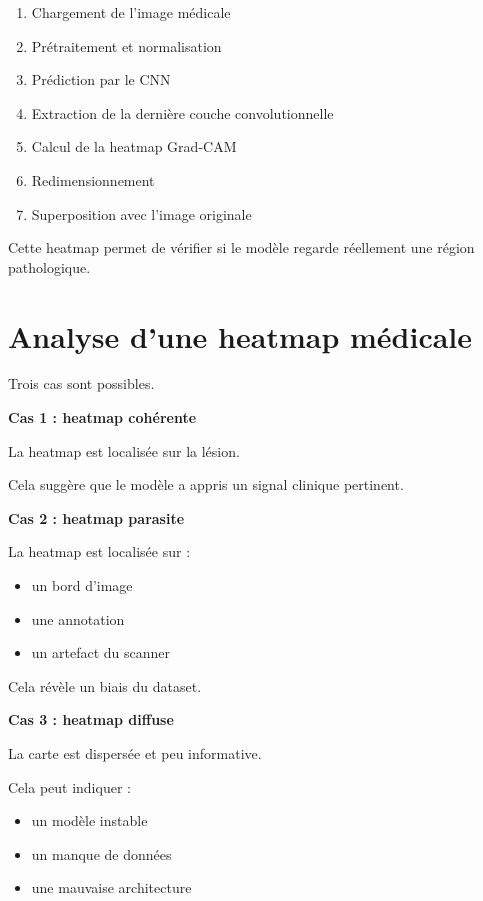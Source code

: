 ﻿\documentclass[11pt,a4paper]{article}
\begin{document}
\begin{enumerate}

\item Chargement de l'image médicale

\item Prétraitement et normalisation

\item Prédiction par le CNN

\item Extraction de la dernière couche convolutionnelle

\item Calcul de la heatmap Grad-CAM

\item Redimensionnement

\item Superposition avec l'image originale

\end{enumerate}

Cette heatmap permet de vérifier si le modèle regarde réellement une région pathologique.

\section{Analyse d'une heatmap médicale}

Trois cas sont possibles.

\textbf{Cas 1 : heatmap cohérente}

La heatmap est localisée sur la lésion.

Cela suggère que le modèle a appris un signal clinique pertinent.

\textbf{Cas 2 : heatmap parasite}

La heatmap est localisée sur :

\begin{itemize}

\item un bord d'image
\item une annotation
\item un artefact du scanner

\end{itemize}

Cela révèle un biais du dataset.

\textbf{Cas 3 : heatmap diffuse}

La carte est dispersée et peu informative.

Cela peut indiquer :

\begin{itemize}

\item un modèle instable
\item un manque de données
\item une mauvaise architecture

\end{itemize}
\end{document}
